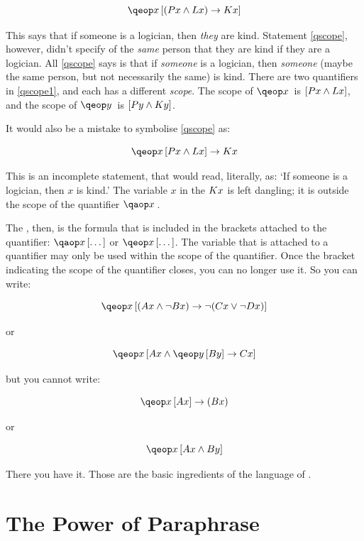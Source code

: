 \documentclass[PHIL101-Textbook.tex]{subfiles}
\begin{document}
\[ \qeb{x}{(\atom Px \land \atom Lx) \eif Kx} \]

\noindent This says that if someone is a logician, then \emph{they} are kind. Statement \ref{qscope}, however, didn't specify of the \emph{same} person that they are kind if they are a logician. All \ref{qscope} says is that if \emph{someone} is a logician, then \emph{someone} (maybe the same person, but not necessarily the same) is kind. There are two quantifiers in \ref{qscope1}, and each has a different \emph{scope}. The scope of $\qe x$ is $[\mathord{P}{x} \land \mathord{L}{x}]$, and the scope of $\qe y$ is $[\mathord{P}{y} \land \mathord{K}{y}]$. 

It would also be a mistake to symbolise \ref{qscope} as: 

\[ \qeb{x}{\atom Px \land \atom Lx} \eif Kx\]

\noindent This is an incomplete statement, that would read, literally, as: `If someone is a logician, then $x$ is kind.' The variable $x$ in the $\mathord{K}{x}$ is left dangling; it is outside the scope of the quantifier $\qa{x}{}$. 

The , then, is the formula that is included in the brackets attached to the quantifier: $\qab{x}{\dots}$ or $\qeb{x}{\dots}$. The variable that is attached to a quantifier may only be used within the scope of the quantifier. Once the bracket indicating the scope of the quantifier closes, you can no longer use it. So you can write:

\[ \qeb{x}{(\atom A x \land \lnot B x) \eif \lnot(\atom C x \lor \lnot \atom D x)} \]

\noindent or

\[ \qeb{x}{\atom A x \land \qeb{y}{\atom B y}\eif \atom C x}\]

\noindent but you cannot write:

\[ \qeb{x}{\atom Ax} \eif (\atom Bx)\]

\noindent or

\[ \qeb{x}{\atom Ax \land \atom By}\]

There you have it. Those are the basic ingredients of the language of \pl.


\section{The Power of Paraphrase}
\end{document}
